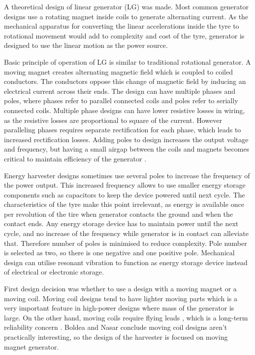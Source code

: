 A theoretical design of linear generator (LG) was made. Most common generator designs use a rotating magnet inside coils to generate alternating current. As the mechanical apparatus for converting the linear accelerations inside the tyre to rotational movement would add to complexity and cost of the tyre, generator is designed to use the linear motion as the power source.

Basic principle of operation of LG is similar to traditional rotational generator. A moving magnet creates alternating magnetic field which is coupled to coiled conductors. The conductors oppose this change of magnetic field by inducing an electrical current across their ends. The design can have multiple phases and poles, where phases refer to parallel connected coils and poles refer to serially connected coils. Multiple phase designs can have lower resistive losses in wiring, as the resistive losses are proportional to square of the current. However paralleling phases requires separate rectification for each phase, which leads to increased rectification losses. Adding poles to design increases the output voltage and frequency, but having a small airgap between the coils and magnets becomes critical to maintain efficiency of the generator \cite{Cheng2008}. 

Energy harvester designs sometimes use several poles to increase the frequency of the power output. This increased frequency allows to use smaller energy storage components such as capacitors to keep the device powered until next cycle. The characteristics of the tyre make this point irrelevant, as energy is available once per revolution of the tire when generator contacts the ground and when the contact ends. Any energy storage device has to maintain power until the next cycle, and no increase of the frequency while generator is in contact can alleviate that. Therefore number of poles is minimised to reduce complexity. Pole number is selected as two, so there is one negative and one positive pole. Mechanical design can utilise resonant vibration to function as energy storage device instead of electrical or electronic storage.

First design decision was whether to use a design with a moving magnet or a moving coil. Moving coil designs tend to have lighter moving parts which is a very important feature in high-power designs where mass of the generator is large. On the other hand, moving coils require flying leads  \cite{Jacob2011},  which is a long-term reliability concern  \cite{Boldea1999}.  Boldea and Nasar \cite[p. 203]{Boldea1999a} conclude moving coil designs aren't practically interesting, so the design of the harvester is focused on moving magnet generator.

